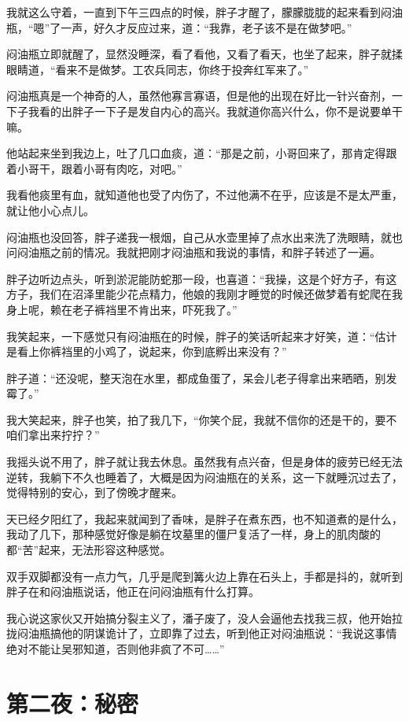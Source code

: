 我就这么守着，一直到下午三四点的时候，胖子才醒了，朦朦胧胧的起来看到闷油瓶，“嗯”了一声，好久才反应过来，道：“我靠，老子该不是在做梦吧。”

闷油瓶立即就醒了，显然没睡深，看了看他，又看了看天，也坐了起来，胖子就揉眼睛道，“看来不是做梦。工农兵同志，你终于投奔红军来了。”

闷油瓶真是一个神奇的人，虽然他寡言寡语，但是他的出现在好比一针兴奋剂，一下子我看的出胖子一下子是发自内心的高兴。我就道你高兴什么，你不是说要单干嘛。

他站起来坐到我边上，吐了几口血痰，道：“那是之前，小哥回来了，那肯定得跟着小哥干，跟着小哥有肉吃，对吧。”

我看他痰里有血，就知道他也受了内伤了，不过他满不在乎，应该是不是太严重，就让他小心点儿。

闷油瓶也没回答，胖子递我一根烟，自己从水壶里掉了点水出来洗了洗眼睛，就也问闷油瓶之前的情况。我就把刚才闷油瓶和我说的事情，和胖子转述了一遍。

胖子边听边点头，听到淤泥能防蛇那一段，也喜道：“我操，这是个好方子，有这方子，我们在沼泽里能少花点精力，他娘的我刚才睡觉的时候还做梦着有蛇爬在我身上呢，赖在老子裤裆里不肯出来，吓死我了。”

我笑起来，一下感觉只有闷油瓶在的时候，胖子的笑话听起来才好笑，道：“估计是看上你裤裆里的小鸡了，说起来，你到底孵出来没有？”

胖子道：“还没呢，整天泡在水里，都成鱼蛋了，呆会儿老子得拿出来晒晒，别发霉了。”

我大笑起来，胖子也笑，拍了我几下，“你笑个屁，我就不信你的还是干的，要不咱们拿出来拧拧？”

我摇头说不用了，胖子就让我去休息。虽然我有点兴奋，但是身体的疲劳已经无法逆转，我躺下不久也睡着了，大概是因为闷油瓶在的关系，这一下就睡沉过去了，觉得特别的安心，到了傍晚才醒来。

天已经夕阳红了，我起来就闻到了香味，是胖子在煮东西，也不知道煮的是什么，我动了几下，那种感觉好像是躺在坟墓里的僵尸复活了一样，身上的肌肉酸的都“苦”起来，无法形容这种感觉。

双手双脚都没有一点力气，几乎是爬到篝火边上靠在石头上，手都是抖的，就听到胖子在和闷油瓶说话，他正在问闷油瓶有什么打算。

我心说这家伙又开始搞分裂主义了，潘子废了，没人会逼他去找我三叔，他开始拉拢闷油瓶搞他的阴谋诡计了，立即靠了过去，听到他正对闷油瓶说：“我说这事情绝对不能让吴邪知道，否则他非疯了不可……”

\chapter{第二夜：秘密}

